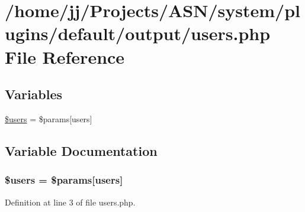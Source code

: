 \hypertarget{output_2users_8php}{}\section{/home/jj/\+Projects/\+A\+S\+N/system/plugins/default/output/users.php File Reference}
\label{output_2users_8php}
\subsection*{Variables}
\begin{DoxyCompactItemize}
\item 
\hyperlink{output_2users_8php_a28005d22fa7ef2dfe215ad886b497d9c}{\$users} = \$params\mbox{[}\textquotesingle{}users\textquotesingle{}\mbox{]}
\end{DoxyCompactItemize}


\subsection{Variable Documentation}
\subsubsection[{\texorpdfstring{\$users}{$users}}]{\setlength{\rightskip}{0pt plus 5cm}\$users = \$params\mbox{[}\textquotesingle{}users\textquotesingle{}\mbox{]}}\hypertarget{output_2users_8php_a28005d22fa7ef2dfe215ad886b497d9c}{}\label{output_2users_8php_a28005d22fa7ef2dfe215ad886b497d9c}


Definition at line 3 of file users.\+php.

